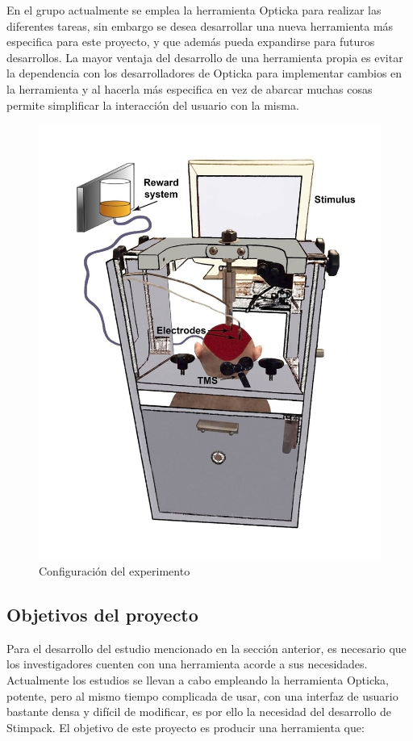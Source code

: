 \documentclass[conference]{IEEEtran}
\begin{document}
En el grupo actualmente se emplea la herramienta Opticka\cite{opticka} para realizar las diferentes tareas, sin embargo se desea desarrollar una nueva herramienta más especifica para este proyecto, y que además pueda expandirse para futuros desarrollos. La mayor ventaja del desarrollo de una herramienta propia es evitar la dependencia con los desarrolladores de Opticka para implementar cambios en la herramienta y al hacerla más especifica en vez de abarcar muchas cosas permite simplificar la interacción del usuario con la misma.

\begin{figure}[htbp]
\centerline{\includegraphics[width=\linewidth]{figures/mono}}
\caption{Configuración del experimento}
\label{figMono}
\end{figure}
\subsection{Objetivos del proyecto}

Para el desarrollo del estudio mencionado en la sección anterior, es necesario que los investigadores cuenten con una herramienta acorde a sus necesidades. Actualmente los estudios se llevan a cabo empleando la herramienta Opticka, potente, pero al mismo tiempo complicada de usar, con una interfaz de usuario bastante densa y difícil de modificar, es por ello la necesidad del desarrollo de Stimpack.
El objetivo de este proyecto es producir una herramienta que:
\end{document}
